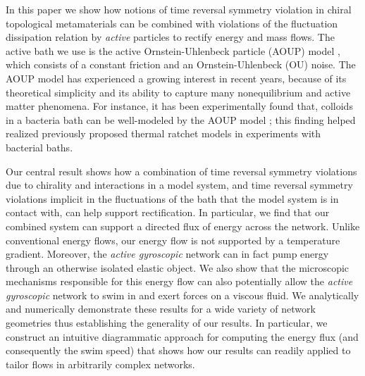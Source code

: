 \documentclass[
 preprint,
 preprintnumbers,
 amsmath,amssymb,
 aps,
 pre,
 longbibliography,
 superscriptaddress,
 10pt, twocolumn
]{revtex4-1}
\begin{document}

 In this paper we show how notions of time reversal symmetry violation in chiral topological metamaterials can be combined with violations of the fluctuation dissipation relation by \textit{active} particles to rectify energy and mass flows. The active bath we use is the active Ornstein-Uhlenbeck particle (AOUP) model \cite{Fodor2016HowFar}, which consists of a constant friction and an Ornstein-Uhlenbeck (OU) noise. The AOUP model has experienced a growing interest in recent years, because of its theoretical simplicity and its ability to capture many nonequilibrium and active matter phenomena.
For instance, it has been experimentally found that, colloids in a bacteria bath can be well-modeled by the AOUP model \cite{Wu2000ParticleDiffusion}; this finding helped realized previously proposed thermal ratchet models \cite{Magnasco1993ForcedThermal} in experiments with bacterial baths. \cite{Koumakis2013TargetedDelivery}

 Our central result shows how a combination of time reversal symmetry violations due to chirality and interactions in a model system, and time reversal symmetry violations implicit in the fluctuations of the bath that the model system is in contact with, can help support rectification. In particular, we find that our combined system can support a directed flux of energy across the network. Unlike conventional energy flows, our energy flow is not supported by a temperature gradient. Moreover, the \textit{active gyroscopic} network can in fact pump energy through an otherwise isolated elastic object. We also show that the microscopic mechanisms responsible for this energy flow can also potentially allow the \textit{active gyroscopic} network to swim in and exert forces on a viscous fluid. We analytically and numerically demonstrate these results for a wide variety of network geometries thus establishing the generality of our results. In particular, we construct an intuitive diagrammatic approach for computing the energy flux (and consequently the swim speed) that shows how our results can readily applied to tailor flows in arbitrarily complex networks.
\end{document}
